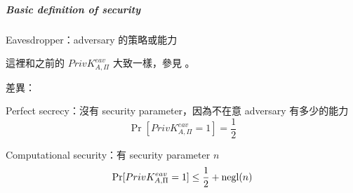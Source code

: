 \subparagraph{Basic definition of security}

Eavesdropper：adversary 的策略或能力

這裡和之前的 \(PrivK_{A, \Pi}^{eav}\) 大致一樣，參見 。

差異：
\begin{myItemize}
	\item Perfect secrecy：沒有 security parameter，因為不在意 adversary 有多少的能力
		\[\Pr[PrivK_{A, \Pi}^{eav} = 1] = \frac{1}{2}\]
	\item Computational security：有 security parameter \(n\)
		\[\Pr[PrivK_{A, \Pi}^{eav} = 1] \leq \frac{1}{2} + \operatorname{negl}(n)\]
\end{myItemize}

